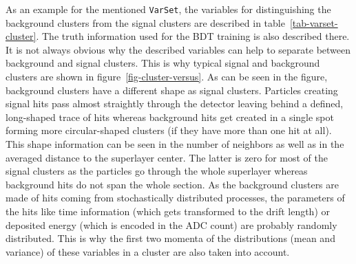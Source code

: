 As an example for the mentioned \texttt{VarSet}, the variables for distinguishing the background clusters from the signal clusters are described in table~\ref{tab-varset-cluster}. The truth information used for the BDT training is also described there. It is not always obvious why the described variables can help to separate between background and signal clusters. This is why typical signal and background clusters are shown in figure~\ref{fig-cluster-versus}. As can be seen in the figure, background clusters have a different shape as signal clusters. Particles creating signal hits pass almost straightly through the detector leaving behind a defined, long-shaped trace of hits whereas background hits get created in a single spot forming more circular-shaped clusters (if they have more than one hit at all). This shape information can be seen in the number of neighbors as well as in the averaged distance to the superlayer center. The latter is zero for most of the signal clusters as the particles go through the whole superlayer whereas background hits do not span the whole section. As the background clusters are made of hits coming from stochastically distributed processes, the parameters of the hits like time information (which gets transformed to the drift length) or deposited energy (which is encoded in the ADC count) are probably randomly distributed. This is why the first two momenta of the distributions (mean and variance) of these variables in a cluster are also taken into account.

